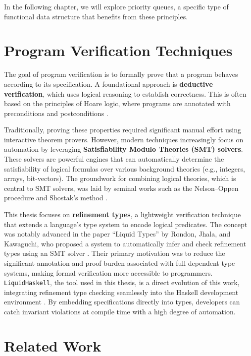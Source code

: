 In the following chapter, we will explore priority queues, a specific type of functional data structure that benefits from these principles.

\section{Program Verification Techniques}

The goal of program verification is to formally prove that a program behaves according to its specification.
A foundational approach is \textbf{deductive verification}, which uses logical reasoning to establish correctness.
This is often based on the principles of Hoare logic, where programs are annotated with preconditions and postconditions \cite{Hoare69}.

Traditionally, proving these properties required significant manual effort using interactive theorem provers.
However, modern techniques increasingly focus on automation by leveraging \textbf{Satisfiability Modulo Theories (SMT) solvers}.
These solvers are powerful engines that can automatically determine the satisfiability of logical formulas over various background theories (e.g., integers, arrays, bit-vectors).
The groundwork for combining logical theories, which is central to SMT solvers, was laid by seminal works such as the Nelson–Oppen procedure \cite{Nelson79} and Shostak's method \cite{Shostak84}.

This thesis focuses on \textbf{refinement types}, a lightweight verification technique that extends a language's type system to encode logical predicates.
The concept was notably advanced in the paper ``Liquid Types'' by Rondon, Jhala, and Kawaguchi, who proposed a system to automatically infer and check refinement types using an SMT solver \cite{rondonLiquidTypes2008}.
Their primary motivation was to reduce the significant annotation and proof burden associated with full dependent type systems, making formal verification more accessible to programmers.
\texttt{LiquidHaskell}, the tool used in this thesis, is a direct evolution of this work, integrating refinement type checking seamlessly into the Haskell development environment \cite{vazou2014}.
By embedding specifications directly into types, developers can catch invariant violations at compile time with a high degree of automation.

\section{Related Work}

